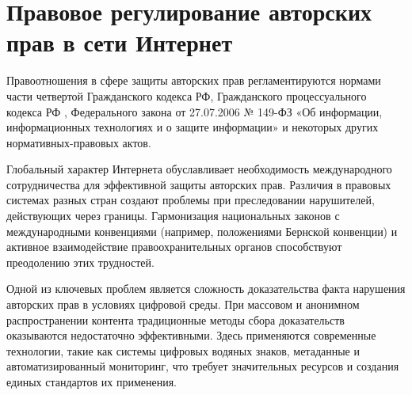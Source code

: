 \section{Правовое регулирование авторских прав в сети Интернет}

Правоотношения в сфере защиты авторских прав регламентируются нормами части четвертой
Гражданского кодекса РФ, Гражданского процессуального кодекса РФ \cite{gpkRF},
Федерального закона от 27.07.2006 № 149-ФЗ «Об информации, информационных технологиях и о
защите информации» \cite{fz149} и некоторых других нормативных-правовых актов.

Глобальный характер Интернета обуславливает необходимость международного сотрудничества
для эффективной защиты авторских прав. Различия в правовых системах разных стран создают
проблемы при преследовании нарушителей, действующих через границы. Гармонизация
национальных законов с международными конвенциями (например, положениями Бернской
конвенции) и активное взаимодействие правоохранительных органов способствуют
преодолению этих трудностей.

Одной из ключевых проблем является сложность доказательства факта нарушения авторских
прав в условиях цифровой среды. При массовом и анонимном распространении контента
традиционные методы сбора доказательств оказываются недостаточно эффективными. Здесь
применяются современные технологии, такие как системы цифровых водяных знаков, метаданные
и автоматизированный мониторинг, что требует значительных ресурсов и создания единых
стандартов их применения.
